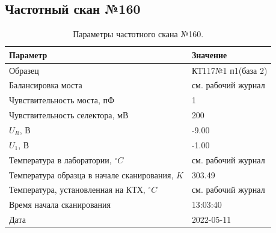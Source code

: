 \subsection{Частотный скан №160}
\begin{table}[!ht]
    \centering
    \caption{Параметры частотного скана №160.}
    \begin{tabular}{|l|l|}
        \hline
        Параметр                                       & Значение                  \\ \hline
        Образец                                        & КТ117№1 п1(база 2)        \\ \hline
        Балансировка моста                             & см. рабочий журнал        \\ \hline
        Чувствительность моста, пФ                     & 1                         \\ \hline
        Чувствительность селектора, мВ                 & 200                       \\ \hline
        $U_R$, В                                       & -9.00                     \\ \hline
        $U_1$, В                                       & -1.00                     \\ \hline
        Температура в лаборатории, $^\circ C$          & см. рабочий журнал        \\ \hline
        Температура образца в начале сканирования, $K$ & 303.49                    \\ \hline
        Температура, установленная на КТХ, $^\circ C$  & см. рабочий журнал        \\ \hline
        Время начала сканирования                      & 13:03:40                  \\ \hline
        Дата                                           & 2022-05-11                \\ \hline
    \end{tabular}
    \label{table:frequency_scan_160}
\end{table}


